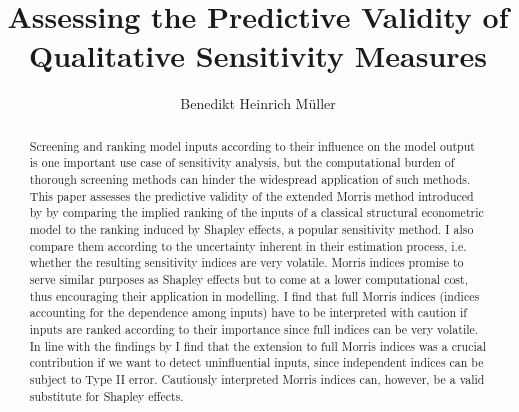 \documentclass[a4paper,12pt]{article}
\begin{document}

\newpage

\thispagestyle{empty}

\title{Assessing the Predictive Validity of Qualitative Sensitivity Measures}
\author{Benedikt Heinrich Müller}
\date{}
\maketitle \thispagestyle{empty}
\begin{abstract}
	Screening and ranking model inputs according to their influence on the model output is one important use case of sensitivity analysis, but the computational burden of thorough screening methods can hinder the widespread application of such methods.
	This paper assesses the predictive validity of the extended Morris method introduced by \citet{GM17} by comparing the implied ranking of the inputs of a classical structural econometric model to the ranking induced by Shapley effects, a popular sensitivity method. I also compare them according to the uncertainty inherent in their estimation process, i.e. whether the resulting sensitivity indices are very volatile. Morris indices promise to serve similar purposes as Shapley effects but to come at a lower computational cost, thus encouraging their application in modelling.
	I find that full Morris indices (indices accounting for the dependence among inputs) have to be interpreted with caution if inputs are ranked according to their importance since full indices can be very volatile. In line with the findings by \citet{GM17} I find that the extension to full Morris indices was a crucial contribution if we want to detect uninfluential inputs, since independent indices can be subject to Type II error.
	Cautiously interpreted Morris indices can, however, be a valid substitute for Shapley effects. %
\end{abstract}
\newpage
\end{document}

